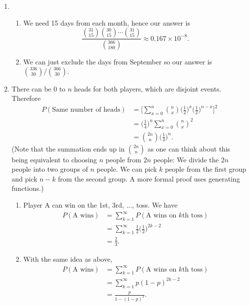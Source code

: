 \documentclass{article}
\begin{document}
\begin{enumerate}
    \item \begin{enumerate}
        \item We need 15 days from each month, hence our answer is 
        \[ \frac{\binom{31}{15}\binom{30}{15}\cdots\binom{31}{15}}{\binom{366}{180}} 
        \approx 0.167 \times 10^{-8}. \]

        \item We can just exclude the days from September so our answer is 
        $\binom{336}{30} / \binom{366}{30}.$
    \end{enumerate}

    \item There can be 0 to $n$ heads for both players, which are disjoint events. Therefore 
    \begin{align*}
        P(\text{Same number of heads}) 
        &= \Big[ \sum_{x = 0}^{n} \binom{n}{x} \Big(\frac{1}{2} \Big)^{x} 
        \Big(\frac{1}{2} \Big)^{n - x}\Big]^2 \\
        &= \Big( \frac{1}{4} \Big)^{n} \sum_{x = 0}^{n} \binom{n}{x}^{2} \\
        &= \binom{2n}{n} \Big( \frac{1}{4} \Big)^{n}.
    \end{align*}
    (Note that the summation ends up in $\binom{2n}{n}$ as one can think about this being 
    equivalent to choosing $n$ people from $2n$ people: We divide the $2n$ people into two 
    groups of $n$ people. We can pick $k$ people from the first group and pick $n - k$ from 
    the second group. A more formal proof uses generating functions.)

    \begin{enumerate}
        \item Player A can win on the 1st, 3rd, ..., toss. We have 
        \begin{align*}
            P(\text{A wins}) 
            &= \sum_{k = 1}^{\infty} P(\text{A wins on } k \text{th toss}) \\
            &= \sum_{k = 1}^{\infty} \frac{1}{2} \Big( \frac{1}{2} \Big)^{2k - 2} \\
            &= \frac{2}{3}.
        \end{align*}

        \item With the same idea as above, 
        \begin{align*}
            P(\text{A wins}) 
            &= \sum_{k = 1}^{\infty} P(\text{A wins on } k \text{th toss}) \\
            &= \sum_{k = 1}^{\infty} p (1 - p)^{2k - 2} \\
            &= \frac{p}{1 - (1-p)^2}.
        \end{align*}


\end{enumerate}
\end{enumerate}
\end{document}
